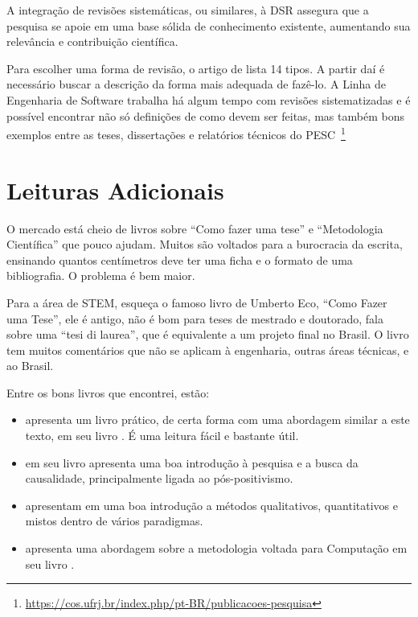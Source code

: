 A integração de revisões sistemáticas, ou similares, à DSR assegura que a pesquisa se apoie em uma base sólida de conhecimento existente, aumentando sua relevância e contribuição científica.

Para escolher uma forma de revisão, o artigo de \citet{grant2009typology} lista 14 tipos. A partir daí é necessário buscar a descrição da forma mais adequada de fazê-lo. A Linha de Engenharia de Software trabalha há algum tempo com revisões sistematizadas e é possível encontrar não só definições de como devem ser feitas, mas também bons exemplos entre as teses, dissertações e relatórios técnicos do PESC~\footnote{\url{https://cos.ufrj.br/index.php/pt-BR/publicacoes-pesquisa}}

\section{Leituras Adicionais}


O mercado está cheio de livros sobre ``Como fazer uma tese'' e ``Metodologia Científica'' que pouco ajudam. Muitos são voltados para a burocracia da escrita, ensinando quantos centímetros deve ter uma ficha e o formato de uma bibliografia. O problema é bem maior.

Para a área de STEM, esqueça o famoso livro de Umberto Eco, ``Como Fazer uma Tese'', ele é antigo, não é bom para teses de mestrado e doutorado, fala sobre uma ``tesi di laurea'', que é equivalente a um projeto final no Brasil. O livro tem muitos comentários que não se aplicam à engenharia, outras áreas técnicas, e ao Brasil. 

Entre os bons livros que encontrei, estão:
\begin{itemize}
    \item \citet{freitas2001} apresenta um livro prático, de certa forma com uma abordagem similar a este texto, em seu livro . É uma leitura fácil e bastante útil.
\item \citet{woodwell2014} em seu livro  apresenta uma boa introdução à pesquisa e a busca da causalidade, principalmente ligada ao pós-positivismo.
\item \citet{creswell2021projeto} apresentam em  uma boa introdução a métodos qualitativos, quantitativos e mistos dentro de vários paradigmas.
\item \citet{Wazla2021} apresenta uma abordagem sobre a metodologia voltada para Computação em seu livro .
\end{itemize}

